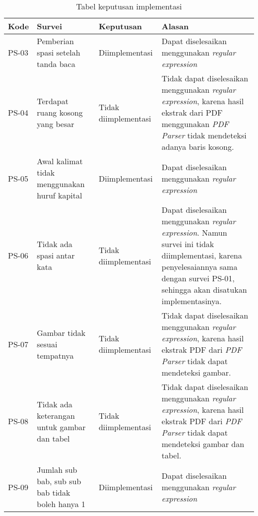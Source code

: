 \begin{table}[H]
	\renewcommand{\arraystretch}{1.5}
	\caption {Tabel keputusan implementasi} \label{tab:keputusan2}
	\begin{center}
		\begin{tabular}{|p{1.5 cm}|>{\raggedright} p{4 cm}| p{2.5 cm}| p{6.5 cm}|}
		\hline
		Kode & Survei & Keputusan & Alasan \\ 
		\hline 
		PS-03 & Pemberian spasi setelah tanda baca & Diimplementasi & Dapat diselesaikan menggunakan \textit{regular expression} \newline \\ 
		\hline 
		PS-04 & Terdapat ruang kosong yang besar & Tidak \newline diimplementasi & Tidak dapat diselesaikan menggunakan \textit{regular expression}, karena hasil ekstrak dari PDF menggunakan \textit{PDF Parser} tidak mendeteksi adanya baris kosong. \newline \\ 		
		\hline 
		PS-05 & Awal kalimat tidak menggunakan huruf kapital & Diimplementasi & Dapat diselesaikan menggunakan \textit{regular expression} \newline \\ 
		\hline
		PS-06 & Tidak ada spasi antar kata & Tidak \newline diimplementasi & Dapat diselesaikan menggunakan \textit{regular expression}. Namun survei ini tidak
diimplementasi, karena penyelesaiannya sama dengan survei PS-01, sehingga akan disatukan implementasinya. \newline \\ 
		\hline 
		PS-07 & Gambar tidak sesuai tempatnya & Tidak \newline diimplementasi & Tidak dapat diselesaikan menggunakan \textit{regular expression}, karena hasil ekstrak PDF dari \textit{PDF Parser} tidak dapat mendeteksi gambar. \newline \\ 
		\hline 
		PS-08 & Tidak ada keterangan untuk gambar dan tabel & Tidak \newline diimplementasi & Tidak dapat diselesaikan menggunakan \textit{regular expression}, karena hasil ekstrak PDF dari \textit{PDF Parser} tidak dapat mendeteksi gambar dan tabel. \newline \\ 
		\hline 
		PS-09 & Jumlah sub bab, sub sub bab tidak boleh hanya 1 & Diimplementasi & Dapat diselesaikan menggunakan \textit{regular expression} \newline \\ 

\end{tabular}
\end{center}
\end{table}
